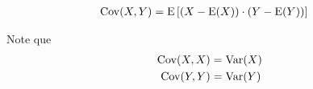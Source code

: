 \begin{definition}\label{def:ch03-covariancia}
    \begin{align}
        \operatorname{Cov}(X, Y) &= \operatorname{E}\left[
            (X-\operatorname{E}(X))\cdot(Y-\operatorname{E}(Y))
        \right]
        \label{eq:ch03-def-covariancia}
    \end{align}

    \begin{obs}
        Note que
        \begin{align*}
            \operatorname{Cov}(X, X) &= \operatorname{Var}(X) \\
            \operatorname{Cov}(Y, Y) &= \operatorname{Var}(Y)
        \end{align*}
    \end{obs}
\end{definition}